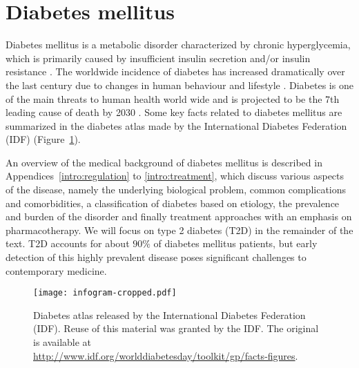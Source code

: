 

\section{Diabetes mellitus} 
\label{intro:diabetes}
Diabetes mellitus is a metabolic disorder characterized by chronic hyperglycemia, which is primarily caused by insufficient insulin secretion and/or insulin resistance \citep{alberti1998definition}. The worldwide incidence of diabetes has increased dramatically over the last century due to changes in human behaviour and lifestyle \citep{zimmet2001global, chen2012worldwide}. Diabetes is one of the main threats to human health world wide \citep{king1998global, zimmet2001global, zimmet2000globalization} and is projected to be the 7th leading cause of death by 2030 \citep{mathers2006projections}. Some key facts related to diabetes mellitus are summarized in the diabetes atlas made by the International Diabetes Federation (IDF) (Figure~\ref{intro:diabetes-infogram}).

An overview of the medical background of diabetes mellitus is described in Appendices~\ref{intro:regulation} to \ref{intro:treatment}, which discuss various aspects of the disease, namely the underlying biological problem, common complications and comorbidities, a classification of diabetes based on etiology, the prevalence and burden of the disorder and finally treatment approaches with an emphasis on pharmacotherapy. 
We will focus on type 2 diabetes (T2D) in the remainder of the text. T2D accounts for about $90\%$ of diabetes mellitus patients, but early detection of this highly prevalent disease poses significant challenges to contemporary medicine.

\begin{figure}[p]
  \centering
  \texttt{[image: infogram-cropped.pdf]}
  \caption{Diabetes atlas released by the International Diabetes Federation (IDF). Reuse of this material was granted by the IDF. The original is available at \url{http://www.idf.org/worlddiabetesday/toolkit/gp/facts-figures}.} 
  \label{intro:diabetes-infogram}
\end{figure}






